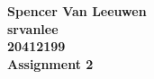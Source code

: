 \documentclass[12pt]{article}
\begin{document}
\begin{center}
{\Large\bf Spencer Van Leeuwen} \\ \vspace{2mm}
{\Large\bf srvanlee} \\ \vspace{2mm}
{\Large\bf 20412199} \\ \vspace{2mm}
{\Large\bf Assignment 2}
\end{center}
\end{document}

